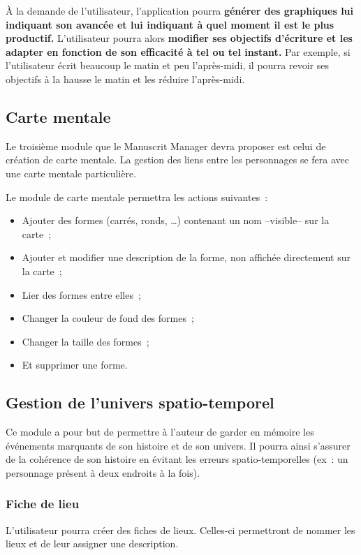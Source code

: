 \documentclass[a4paper,11pt,twoside]{article}
\begin{document}
\`A la demande de l'utilisateur, l'application pourra \textbf{générer des graphiques lui indiquant son avancée et lui indiquant à quel moment il est le plus productif.} L'utilisateur pourra alors \textbf{modifier ses objectifs d'écriture et les adapter en fonction de son efficacité à tel ou tel instant.} Par exemple, si l'utilisateur écrit beaucoup le matin et peu l'après-midi, il pourra revoir ses objectifs à la hausse le matin et les réduire l'après-midi.


\subsection{Carte mentale}
Le troisième module que le Manuscrit Manager devra proposer est celui de création de carte mentale. La gestion des liens entre les personnages se fera avec une carte mentale particulière.

Le module de carte mentale permettra les actions suivantes~:
\begin{itemize}
	\item Ajouter des formes (carrés, ronds, \ldots) contenant un nom --visible-- sur la carte~;
    \item Ajouter et modifier une description de la forme, non affichée directement sur la carte~;
    \item Lier des formes entre elles~;
    \item Changer la couleur de fond des formes~;
    \item Changer la taille des formes~;
    \item Et supprimer une forme.
\end{itemize}


\subsection{Gestion de l'univers spatio-temporel}
Ce module a pour but de permettre à l'auteur de garder en mémoire les événements marquants de son histoire et de son univers. Il pourra ainsi s'assurer de la cohérence de son histoire en évitant les erreurs spatio-temporelles (ex~: un personnage présent à deux endroits à la fois).

\subsubsection{Fiche de lieu}
L'utilisateur pourra créer des fiches de lieux. Celles-ci permettront de nommer les lieux et de leur assigner une description.
\end{document}
